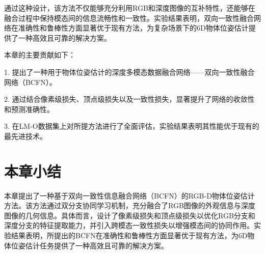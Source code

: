 通过这种设计，该方法不仅能够充分利用RGB和深度图像的互补特性，还能够在融合过程中保持模态间的信息流畅性和一致性。实验结果表明，双向一致性融合网络在准确性和鲁棒性方面显著优于现有方法，为复杂场景下的6D物体位姿估计提供了一种高效且可靠的解决方案。

本章的主要贡献如下：

1. 提出了一种用于物体位姿估计的深度多模态数据融合网络——双向一致性融合网络（BCFN）。

2. 通过结合像素级损失、顶点级损失以及一致性损失，显著提升了网络的收敛性和预测准确性。

3. 在LM-O数据集上对所提方法进行了全面评估，实验结果表明其性能优于现有的最先进技术。


\section{本章小结}
本章提出了一种基于双向一致性信息融合网络（BCFN）的RGB-D物体位姿估计方法。该方法通过双分支协同学习机制，充分融合了RGB图像的外观信息与深度图像的几何信息。具体而言，设计了像素级损失和顶点级损失以优化RGB分支和深度分支的特征提取能力，并引入跨模态一致性损失以增强模态间的协同作用。实验结果表明，所提出的BCFN在准确性和鲁棒性方面显著优于现有方法，为6D物体位姿估计任务提供了一种高效且可靠的解决方案。